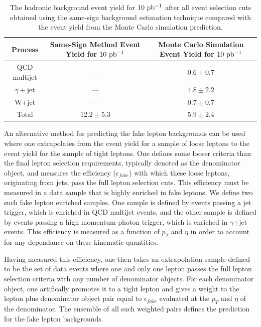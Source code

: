 \documentclass{cmspaper}
\begin{document}
\begin{table}[!ht]
\begin{center}
\begin{tabular}{|c|c|c|}
\hline
 Process & Same-Sign Method Event Yield for $10\ \mathrm{pb^{-1}}$ & Monte Carlo Simulation Event Yield for $10\ \mathrm{pb^{-1}}$\\
\hline
\hline
 QCD multijet               & ---             &  $0.6 \pm 0.7$ \\
 $\gamma+$jet               & ---             &  $4.8 \pm 2.2$ \\
 W+jet                      & ---             &  $0.7 \pm 0.7$ \\
 Total                      & $12.2 \pm 5.3$  &  $5.9 \pm 2.4$  \\

\hline
\end{tabular}
\caption{The hadronic background event yield for $10\ \mathrm{pb^{-1}}$ after all \Z\To\Ep\Em event selection cuts obtained using the same-sign background estimation technique compared with the event yield from the Monte Carlo simulation prediction.\label{tab:zeeHadBckSameSignMethod}}
\end{center}
\end{table}


An alternative method for predicting the fake lepton backgrounds can be used where one extrapolates from the event yield for a sample of loose leptons to the event yield for the sample of tight leptons\cite{FakeRateNote}. One defines some looser criteria than the final lepton selection requirements, typically denoted as the denominator object, and measures the efficiency ($\epsilon_{fake}$) with which these loose leptons, originating from jets, pass the full lepton selection cuts. This efficiency must be measured in a data sample that is highly enriched in fake leptons. We define two such fake lepton enriched samples. One sample is defined by events passing a jet trigger, which is enriched in QCD multijet events, and the other sample is defined by events passing a high momentum photon trigger, which is enriched in $\gamma$+jet events. This efficiency is measured as a function of $p_T$ and $\eta$ in order to account for any dependance on these kinematic quantities. 

Having measured this efficiency, one then takes an extrapolation sample defined to be the set of data events where one and only one lepton passes the full lepton selection criteria with any number of denominator objects. For each denominator object, one artifically promotes it to a tight lepton and gives a weight to the lepton plus denominator object pair equal to $\epsilon_{fake}$ evaluated at the $p_T$ and $\eta$ of the denominator. The ensemble of all such weighted pairs defines the prediction for the fake lepton backgrounds.
\end{document}
